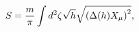 \begin{equation}\label{conaction}
S= {m\over\pi}\int d^{2}\zeta \sqrt{h}\sqrt{ \left(\Delta(h)
X_{\mu}\right)^{2}},
\end{equation}

